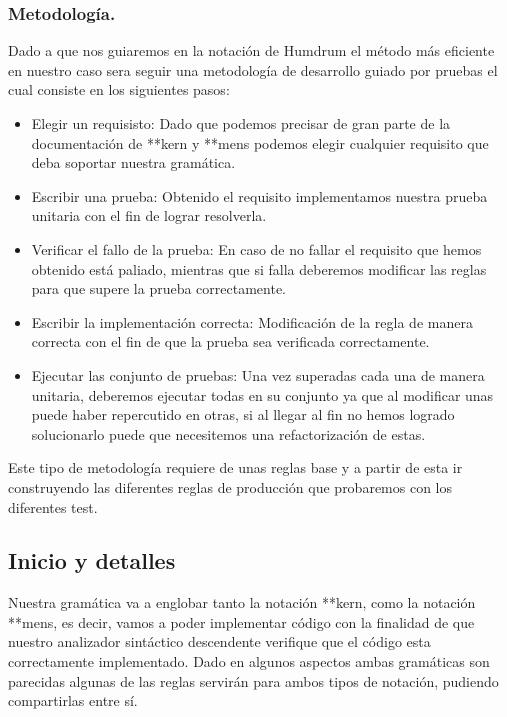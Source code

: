 \documentclass{article}
\begin{document}
    \subsubsection{Metodología.}
    Dado a que nos guiaremos en la notación de Humdrum
    el método más eficiente en nuestro caso sera seguir una metodología de desarrollo guiado por pruebas el cual consiste
    en los siguientes pasos:
    \begin{itemize}
        \item Elegir un requisisto: Dado que podemos precisar de gran parte de la documentación de **kern y **mens podemos elegir
        cualquier requisito que deba soportar nuestra gramática.
        \item Escribir una prueba: Obtenido el requisito implementamos nuestra prueba unitaria con el fin de lograr resolverla.
        \item Verificar el fallo de la prueba: En caso de no fallar el requisito que hemos obtenido está paliado, mientras
        que si falla deberemos modificar las reglas para que supere la prueba correctamente.
        \item Escribir la implementación correcta: Modificación de la regla de manera correcta con el fin de que la prueba sea
        verificada correctamente.
        \item Ejecutar las conjunto de pruebas: Una vez superadas cada una de manera unitaria, deberemos ejecutar todas en
        su conjunto ya que al modificar unas puede haber repercutido en otras, si al llegar al fin no hemos logrado solucionarlo
        puede que necesitemos una refactorización de estas.
    \end{itemize}

    Este tipo de metodología requiere de unas reglas base y a partir de esta ir construyendo las diferentes reglas de producción
    que probaremos con los diferentes test.

    \subsection{Inicio y detalles}

    Nuestra gramática va a englobar tanto la notación **kern, como la notación **mens, es decir, vamos a poder implementar
    código con la finalidad de que nuestro analizador sintáctico descendente verifique que el código esta correctamente
    implementado.
    Dado en algunos aspectos ambas gramáticas son parecidas algunas de las reglas servirán para ambos tipos de notación,
    pudiendo compartirlas entre sí.
\end{document}
